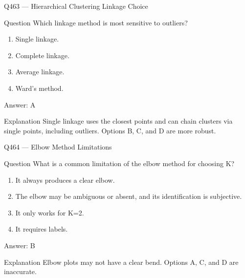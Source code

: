 \documentclass[aspectratio=169,8pt]{beamer}
\begin{document}
	\begin{frame}{Q463 --- Hierarchical Clustering Linkage Choice}
		\begin{block}{Question}
			Which linkage method is most sensitive to outliers?
			\begin{enumerate}
				\item Single linkage.
				\item Complete linkage.
				\item Average linkage.
				\item Ward's method.
			\end{enumerate}
		\end{block}
		\begin{exampleblock}{Answer: A}\end{exampleblock}
		\begin{block}{Explanation}
			Single linkage uses the closest points and can chain clusters via single points, including outliers. Options B, C, and D are more robust.
		\end{block}
	\end{frame}
	
	\begin{frame}{Q464 --- Elbow Method Limitations}
		\begin{block}{Question}
			What is a common limitation of the elbow method for choosing K?
			\begin{enumerate}
				\item It always produces a clear elbow.
				\item The elbow may be ambiguous or absent, and its identification is subjective.
				\item It only works for K=2.
				\item It requires labels.
			\end{enumerate}
		\end{block}
		\begin{exampleblock}{Answer: B}\end{exampleblock}
		\begin{block}{Explanation}
			Elbow plots may not have a clear bend. Options A, C, and D are inaccurate.
		\end{block}
	\end{frame}
	
\end{document}
